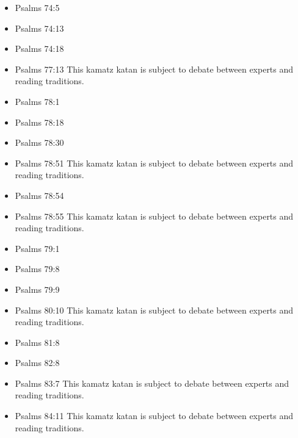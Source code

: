 \documentclass[14pt]{book}
\begin{document}
\begin{multicols}{2}
\begin{itemize}
	\item Psalms 74:5
			
			\item Psalms 74:13
			
			\item Psalms 74:18
			
			\item Psalms 77:13 This kamatz katan is subject to debate between experts and reading traditions.
			
			\item Psalms 78:1
			
			\item Psalms 78:18
			
			\item Psalms 78:30
			
			\item Psalms 78:51 This kamatz katan is subject to debate between experts and reading traditions.
			
			\item Psalms 78:54
			
			\item Psalms 78:55 This kamatz katan is subject to debate between experts and reading traditions.
			
			\item Psalms 79:1
			
			\item Psalms 79:8
					
					\item Psalms 79:9
					
					\item Psalms 80:10 This kamatz katan is subject to debate between experts and reading traditions.
					
					\item Psalms 81:8
					
					\item Psalms 82:8
					
					\item Psalms 83:7 This kamatz katan is subject to debate between experts and reading traditions.
					
					\item Psalms 84:11 This kamatz katan is subject to debate between experts and reading traditions.
					

\end{itemize}
\end{multicols}
\end{document}
